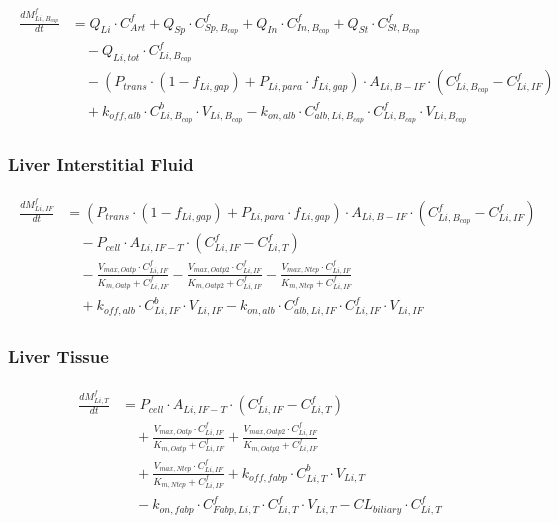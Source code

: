 \documentclass[preprint,12pt,authoryear]{elsarticle}
\begin{document}
\begin{align}
\begin{aligned}
\frac{dM_{Li,B_{cap}}^f}{dt} &= Q_{Li} \cdot C_{Art}^f 
+ Q_{Sp} \cdot C_{Sp,B_{cap}}^f 
+ Q_{In} \cdot C_{In,B_{cap}}^f 
+ Q_{St} \cdot C_{St,B_{cap}}^f \\
& \quad - Q_{Li,tot} \cdot C_{Li,B_{cap}}^f \\
& \quad - (P_{trans} \cdot  (1-f_{Li,gap}) + P_{Li,para} \cdot f_{Li,gap})  \cdot A_{Li,B-IF} \cdot (C_{Li,B_{cap}}^f - C_{Li,IF}^f) \\
& \quad + k_{off,alb} \cdot C_{Li,B_{cap}}^b \cdot V_{Li,B_{cap}}
- k_{on,alb} \cdot C_{alb,Li,B_{cap}}^f \cdot C_{Li,B_{cap}}^f \cdot V_{Li,B_{cap}}
\end{aligned}
\label{eq:PFOA_liver_blood}
\end{align}

\subsubsection{Liver Interstitial Fluid}

\begin{align}
\begin{aligned}
\frac{dM_{Li,IF}^f}{dt} &= (P_{trans} \cdot  (1-f_{Li,gap}) + P_{Li,para} \cdot f_{Li,gap}) \cdot A_{Li,B-IF} \cdot (C_{Li,B_{cap}}^f - C_{Li,IF}^f) \\
& \quad- P_{cell} \cdot A_{Li,IF-T}\cdot(C_{Li,IF}^f - C_{Li,T}^f) \\
& \quad - \frac{V_{max,Oatp} \cdot C_{Li,IF}^f}{K_{m,Oatp} + C_{Li,IF}^f}
- \frac{V_{max,Oatp2} \cdot C_{Li,IF}^f}{K_{m,Oatp2} + C_{Li,IF}^f}
- \frac{V_{max,Ntcp} \cdot C_{Li,IF}^f}{K_{m,Ntcp} + C_{Li,IF}^f} \\
& \quad + k_{off,alb} \cdot C_{Li,IF}^b \cdot V_{Li,IF}
- k_{on,alb} \cdot C_{alb,Li,IF}^f \cdot C_{Li,IF}^f \cdot V_{Li,IF}
\end{aligned}
\label{eq:PFOA_liver_interstitial}
\end{align}

\subsubsection{Liver Tissue}

\begin{align}
\begin{aligned}
\frac{dM_{Li,T}^f}{dt} &=   P_{cell} \cdot A_{Li,IF-T}\cdot (C_{Li,IF}^f - C_{Li,T}^f)\\
& \quad+ \frac{V_{max,Oatp} \cdot C_{Li,IF}^f}{K_{m,Oatp} + C_{Li,IF}^f}
+ \frac{V_{max,Oatp2} \cdot C_{Li,IF}^f}{K_{m,Oatp2} + C_{Li,IF}^f} \\
& \quad + \frac{V_{max,Ntcp} \cdot C_{Li,IF}^f}{K_{m,Ntcp} + C_{Li,IF}^f}
+ k_{off,fabp} \cdot C_{Li,T}^b \cdot V_{Li,T} \\
& \quad - k_{on,fabp} \cdot C_{Fabp,Li,T}^f \cdot C_{Li,T}^f \cdot V_{Li,T}
- CL_{biliary} \cdot C_{Li,T}^f
\end{aligned}
\label{eq:PFOA_liver_tissue}
\end{align}
\end{document}
